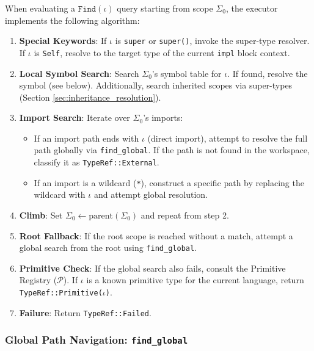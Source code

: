 When evaluating a $\texttt{Find}(\iota)$ query starting from scope
$\Sigma_0$, the executor implements the following algorithm:

\begin{enumerate}
  \item \textbf{Special Keywords}: If $\iota$ is \texttt{super} or
    \texttt{super()}, invoke the super-type resolver. If $\iota$ is
    \texttt{Self}, resolve to the target type of the current
    \texttt{impl} block context.

  \item \textbf{Local Symbol Search}: Search $\Sigma_0$'s symbol
    table for $\iota$. If found, resolve the symbol (see below).
    Additionally, search inherited scopes via super-types (Section
    \ref{sec:inheritance_resolution}).

  \item \textbf{Import Search}: Iterate over $\Sigma_0$'s imports:
    \begin{itemize}
      \item If an import path ends with $\iota$ (direct import), attempt
        to resolve the full path globally via \texttt{find\_global}.
        If the path is not found in the workspace, classify it as
        \texttt{TypeRef::External}.
      \item If an import is a wildcard (\texttt{*}), construct a
        specific path by replacing the wildcard with $\iota$ and attempt
        global resolution.
    \end{itemize}

  \item \textbf{Climb}: Set $\Sigma_0 \leftarrow
    \text{parent}(\Sigma_0)$ and repeat from step 2.

  \item \textbf{Root Fallback}: If the root scope is reached without
    a match, attempt a global search from the root using \texttt{find\_global}.

  \item \textbf{Primitive Check}: If the global search also fails,
    consult the Primitive Registry ($\mathcal{P}$). If $\iota$ is a
    known primitive type for the current language, return
    \texttt{TypeRef::Primitive($\iota$)}.

  \item \textbf{Failure}: Return \texttt{TypeRef::Failed}.
\end{enumerate}

\subsubsection{Global Path Navigation: \texttt{find\_global}}

